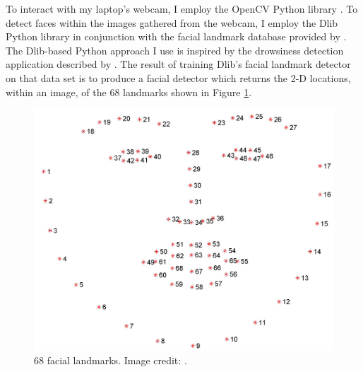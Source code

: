 \documentclass[10pt,a4paper]{article}
\begin{document}
To interact with my laptop's webcam, I employ the OpenCV Python library \citep{opencv_library}. To detect faces within the images gathered from the webcam, I employ the Dlib Python library \citep{King2009} in conjunction with the facial landmark database provided by \citet{Sagonas2016}. The Dlib-based Python approach I use is inspired by the drowsiness detection application described by \cite{Rosebrock2017}. The result of training Dlib's facial landmark detector on that data set is to produce a facial detector which returns the 2-D locations, within an image, of the 68 landmarks shown in Figure \ref{fig:landmarks}.
\begin{figure}
	\centering
	\includegraphics[width=0.8\linewidth]{figure_68_markup}
	\caption{68 facial landmarks. Image credit: \citet{Sagonas}.}
	\label{fig:landmarks}
\end{figure}
\end{document}
